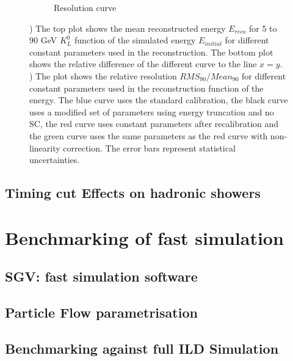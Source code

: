 \begin{figure}
\begin{subfigure}[t]{0.45\textwidth}
    \caption{Resolution curve} \label{fig:resohits}
  \end{subfigure}
  \caption{) The top plot shows the mean reconstructed energy $E_{reco}$ for 5 to 90 GeV $K^{0}_{L}$ function of the simulated energy $E_{initial}$ for different constant parameters used in the reconstruction. The bottom plot shows the relative difference of the different curve to the line $x = y$. ) The plot shows the relative resolution $RMS_{90}/Mean_{90}$ for different constant parameters used in the reconstruction function of the energy. The blue curve uses the standard calibration, the black curve uses a modified set of parameters using energy truncation and no SC, the red curve uses constant parameters after recalibration and the green curve uses the same parameters as the red curve with non-linearity correction. The error bars represent statistical uncertainties.}
\end{figure}


\subsection{Timing cut Effects on hadronic showers}

\section{Benchmarking of fast simulation}

\subsection{SGV: fast simulation software}
\subsection{Particle Flow parametrisation}
\subsection{Benchmarking against full ILD Simulation}
